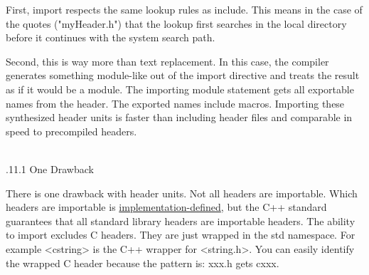 First, import respects the same lookup rules as include. This means in the case of the quotes ("myHeader.h") that the lookup first searches in the local directory before it continues with the system search path.

Second, this is way more than text replacement. In this case, the compiler generates something module-like out of the import directive and treats the result as if it would be a module. The importing module statement gets all exportable names from the header. The exported names include macros. Importing these synthesized header units is faster than including header files and comparable in speed to precompiled headers.

\hspace*{\fill} \\ %
.11.1\hspace{0.2cm} One Drawback

There is one drawback with header units. Not all headers are importable. Which headers are importable is \href{https://en.cppreference.com/w/cpp/language/ub}{implementation-defined}, but the C++ standard guarantees that all standard library headers are importable headers. The ability to import excludes C headers. They are just wrapped in the std namespace. For example <cstring> is the C++ wrapper for <string.h>. You can easily identify the wrapped C header because the pattern is: xxx.h gets cxxx.


